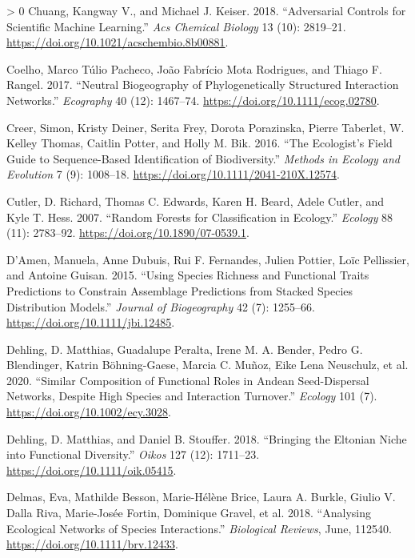 \documentclass[10pt,oneside]{article}
\newlength{\cslhangindent}
\newenvironment{CSLReferences}[3] %
 {%
  \setlength{\parindent}{0pt}
  \ifodd #1 \everypar{\setlength{\hangindent}{\cslhangindent}}\ignorespaces\fi
  \ifnum #2 > 0
  \setlength{\parskip}{#2\baselineskip}
  \fi
 }%
 {}
\begin{document}
\begin{CSLReferences}{1}{0}
\leavevmode\hypertarget{ref-Chuang2018AdvCon}{}%
Chuang, Kangway V., and Michael J. Keiser. 2018. {``Adversarial Controls
for Scientific Machine Learning.''} \emph{Acs Chemical Biology} 13 (10):
2819--21. \url{https://doi.org/10.1021/acschembio.8b00881}.

\leavevmode\hypertarget{ref-Coelho2017NeuBio}{}%
Coelho, Marco Túlio Pacheco, João Fabrício Mota Rodrigues, and Thiago F.
Rangel. 2017. {``Neutral Biogeography of Phylogenetically Structured
Interaction Networks.''} \emph{Ecography} 40 (12): 1467--74.
\url{https://doi.org/10.1111/ecog.02780}.

\leavevmode\hypertarget{ref-Creer2016EcoSF}{}%
Creer, Simon, Kristy Deiner, Serita Frey, Dorota Porazinska, Pierre
Taberlet, W. Kelley Thomas, Caitlin Potter, and Holly M. Bik. 2016.
{``The Ecologist's Field Guide to Sequence-Based Identification of
Biodiversity.''} \emph{Methods in Ecology and Evolution} 7 (9):
1008--18. \url{https://doi.org/10.1111/2041-210X.12574}.

\leavevmode\hypertarget{ref-Cutler2007RanFor}{}%
Cutler, D. Richard, Thomas C. Edwards, Karen H. Beard, Adele Cutler, and
Kyle T. Hess. 2007. {``Random Forests for Classification in Ecology.''}
\emph{Ecology} 88 (11): 2783--92.
\url{https://doi.org/10.1890/07-0539.1}.

\leavevmode\hypertarget{ref-DAmen2015UsiSpe}{}%
D'Amen, Manuela, Anne Dubuis, Rui F. Fernandes, Julien Pottier, Loïc
Pellissier, and Antoine Guisan. 2015. {``Using Species Richness and
Functional Traits Predictions to Constrain Assemblage Predictions from
Stacked Species Distribution Models.''} \emph{Journal of Biogeography}
42 (7): 1255--66. \url{https://doi.org/10.1111/jbi.12485}.

\leavevmode\hypertarget{ref-Dehling2020SimCom}{}%
Dehling, D. Matthias, Guadalupe Peralta, Irene M. A. Bender, Pedro G.
Blendinger, Katrin Böhning-Gaese, Marcia C. Muñoz, Eike Lena Neuschulz,
et al. 2020. {``Similar Composition of Functional Roles in Andean
Seed-Dispersal Networks, Despite High Species and Interaction
Turnover.''} \emph{Ecology} 101 (7).
\url{https://doi.org/10.1002/ecy.3028}.

\leavevmode\hypertarget{ref-Dehling2018BriElt}{}%
Dehling, D. Matthias, and Daniel B. Stouffer. 2018. {``Bringing the
Eltonian Niche into Functional Diversity.''} \emph{Oikos} 127 (12):
1711--23. \url{https://doi.org/10.1111/oik.05415}.

\leavevmode\hypertarget{ref-Delmas2018AnaEco}{}%
Delmas, Eva, Mathilde Besson, Marie-Hélène Brice, Laura A. Burkle,
Giulio V. Dalla Riva, Marie-Josée Fortin, Dominique Gravel, et al. 2018.
{``Analysing Ecological Networks of Species Interactions.''}
\emph{Biological Reviews}, June, 112540.
\url{https://doi.org/10.1111/brv.12433}.


\end{CSLReferences}
\end{document}
